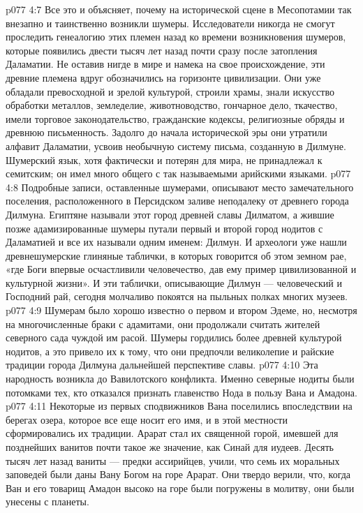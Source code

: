 \vs p077 4:7 Все это и объясняет, почему на исторической сцене в Месопотамии так внезапно и таинственно возникли шумеры. Исследователи никогда не смогут проследить генеалогию этих племен назад ко времени возникновения шумеров, которые появились двести тысяч лет назад почти сразу после затопления Даламатии. Не оставив нигде в мире и намека на свое происхождение, эти древние племена вдруг обозначились на горизонте цивилизации. Они уже обладали превосходной и зрелой культурой, строили храмы, знали искусство обработки металлов, земледелие, животноводство, гончарное дело, ткачество, имели торговое законодательство, гражданские кодексы, религиозные обряды и древнюю письменность. Задолго до начала исторической эры они утратили алфавит Даламатии, усвоив необычную систему письма, созданную в Дилмуне. Шумерский язык, хотя фактически и потерян для мира, не принадлежал к семитским; он имел много общего с так называемыми арийскими языками.
\vs p077 4:8 Подробные записи, оставленные шумерами, описывают место замечательного поселения, расположенного в Персидском заливе неподалеку от древнего города Дилмуна. Египтяне называли этот город древней славы Дилматом, а жившие позже адамизированные шумеры путали первый и второй город нодитов с Даламатией и все их называли одним именем: Дилмун. И археологи уже нашли древнешумерские глиняные таблички, в которых говорится об этом земном рае, «где Боги впервые осчастливили человечество, дав ему пример цивилизованной и культурной жизни». И эти таблички, описывающие Дилмун --- человеческий и Господний рай, сегодня молчаливо покоятся на пыльных полках многих музеев.
\vs p077 4:9 Шумерам было хорошо известно о первом и втором Эдеме, но, несмотря на многочисленные браки с адамитами, они продолжали считать жителей северного сада чуждой им расой. Шумеры гордились более древней культурой нодитов, а это привело их к тому, что они предпочли великолепие и райские традиции города Дилмуна дальнейшей перспективе славы.
\vs p077 4:10 \pc {}\bibnobreakspace {} Эта народность возникла до Вавилотского конфликта. Именно северные нодиты были потомками тех, кто отказался признать главенство Нода в пользу Вана и Амадона.
\vs p077 4:11 \pc Некоторые из первых сподвижников Вана поселились впоследствии на берегах озера, которое все еще носит его имя, и в этой местности сформировались их традиции. Арарат стал их священной горой, имевшей для позднейших ванитов почти такое же значение, как Синай для иудеев. Десять тысяч лет назад ваниты --- предки ассирийцев, учили, что семь их моральных заповедей были даны Вану Богом на горе Арарат. Они твердо верили, что, когда Ван и его товарищ Амадон высоко на горе были погружены в молитву, они были унесены с планеты.
